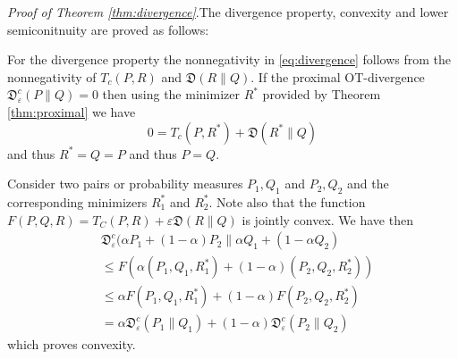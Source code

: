 \documentclass{amsart}
\theoremstyle{definition}
\theoremstyle{remark}
\numberwithin{equation}{section}
\begin{document}
\bigskip

\noindent
{\it Proof of Theorem \ref{thm:divergence}}.The divergence property, convexity and lower semiconitnuity are proved as follows:

For the divergence property  the nonnegativity in  \eqref{eq:divergence} follows from the nonnegativity of  
$T_c(P,R)$ and $\mathfrak{D}(R\|Q)$.   
If the proximal OT-divergence $\mathfrak{D}^{c}_{\varepsilon}(P\|Q)=0$ then using the minimizer $R^*$ provided by Theorem \ref{thm:proximal} we have
\begin{equation}
0 = T_c(P,R^*) + \mathfrak{D}(R^*\|Q)
\end{equation}
and thus $R^*=Q=P$ and thus $P=Q$.

\medskip

 Consider two pairs or probability measures $P_1,Q_1$ and $P_2,Q_2$ and the corresponding minimizers $R_1^*$ and $R_2^*$.  Note also that the function 
$F(P,Q,R) =T_C(P,R)+\varepsilon \mathfrak{D}(R\|Q)$ is jointly convex. We have then 
\begin{equation}
\begin{aligned}
&\mathfrak{D}^{c}_{\varepsilon}(\alpha P_1 + (1-\alpha)P_2\|\alpha Q_1 +(1-\alpha Q_2) \\
&\le F(\alpha(P_1,Q_1,R_1^*) + (1-\alpha)(P_2,Q_2,R_2^*))\\
& \le \alpha F(P_1,Q_1,R_1^*)   + (1-\alpha)F(P_2,Q_2,R_2^*)
 \\
&= \alpha \mathfrak{D}^{c}_{\varepsilon}(P_1 \| Q_1)  + (1-\alpha)\mathfrak{D}^{c}_{\varepsilon}(P_2\| Q_2)\,
\end{aligned}
\end{equation}
which proves convexity.
\medskip
\end{document}
